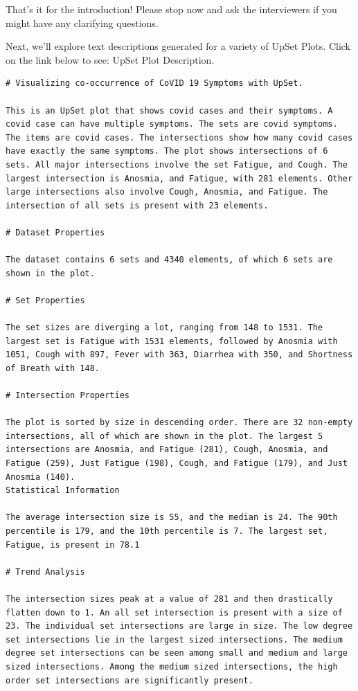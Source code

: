 \documentclass{egpubl}
\begin{document}
That’s it for the introduction! Please stop now and ask the interviewers if you might have any clarifying questions.

Next, we’ll explore text descriptions generated for a variety of UpSet Plots. Click on the link below to see: UpSet Plot Description.


\small
\begin{lstlisting}
# Visualizing co-occurrence of CoVID 19 Symptoms with UpSet.

This is an UpSet plot that shows covid cases and their symptoms. A covid case can have multiple symptoms. The sets are covid symptoms. The items are covid cases. The intersections show how many covid cases have exactly the same symptoms. The plot shows intersections of 6 sets. All major intersections involve the set Fatigue, and Cough. The largest intersection is Anosmia, and Fatigue, with 281 elements. Other large intersections also involve Cough, Anosmia, and Fatigue. The intersection of all sets is present with 23 elements.

# Dataset Properties

The dataset contains 6 sets and 4340 elements, of which 6 sets are shown in the plot.

# Set Properties

The set sizes are diverging a lot, ranging from 148 to 1531. The largest set is Fatigue with 1531 elements, followed by Anosmia with 1051, Cough with 897, Fever with 363, Diarrhea with 350, and Shortness of Breath with 148.

# Intersection Properties

The plot is sorted by size in descending order. There are 32 non-empty intersections, all of which are shown in the plot. The largest 5 intersections are Anosmia, and Fatigue (281), Cough, Anosmia, and Fatigue (259), Just Fatigue (198), Cough, and Fatigue (179), and Just Anosmia (140).
Statistical Information

The average intersection size is 55, and the median is 24. The 90th percentile is 179, and the 10th percentile is 7. The largest set, Fatigue, is present in 78.1

# Trend Analysis

The intersection sizes peak at a value of 281 and then drastically flatten down to 1. An all set intersection is present with a size of 23. The individual set intersections are large in size. The low degree set intersections lie in the largest sized intersections. The medium degree set intersections can be seen among small and medium and large sized intersections. Among the medium sized intersections, the high order set intersections are significantly present.
\end{lstlisting}
\end{document}
